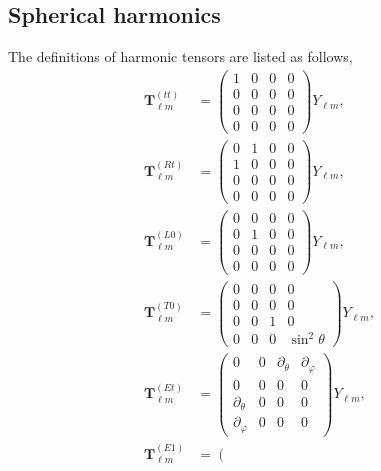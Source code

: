 \documentclass[reprint,amsmath,amssymb,aps,prd]{revtex4-2}
\begin{document}
\begin{widetext}
\appendix

\section{\label{app:spherical_harmonics}Spherical harmonics}
The definitions of harmonic tensors are listed as follows,
\begin{subequations}
\begin{align}
\mathbf{T}^{(tt)}_{\ell m}
&=\left(\begin{array}{cccc}
1 & 0 & 0 & 0\\
0 & 0 & 0 & 0\\
0 & 0 & 0 & 0 \\
0 & 0 & 0 & 0 
\end{array}\right)Y_{\ell m},\\
\mathbf{T}^{(Rt)}_{\ell m}
&=\left(\begin{array}{cccc}
0 & 1 & 0 & 0\\
1 & 0 & 0 & 0\\
0 & 0 & 0 & 0 \\
0 & 0 & 0 & 0 
\end{array}\right)Y_{\ell m},\\
\mathbf{T}^{(L0)}_{\ell m}
&=\left(\begin{array}{cccc}
0 & 0 & 0 & 0\\
0 & 1 & 0 & 0\\
0 & 0 & 0 & 0 \\
0 & 0 & 0 & 0 
\end{array}\right)Y_{\ell m},\\
\mathbf{T}^{(T0)}_{\ell m}
&=\left(\begin{array}{cccc}
0 & 0 & 0 & 0\\
0 & 0 & 0 & 0\\
0 & 0 & 1 & 0 \\
0 & 0 & 0 & \sin^2\theta 
\end{array}\right)Y_{\ell m},\\
\mathbf{T}^{(Et)}_{\ell m}
&=\left(\begin{array}{cccc}
0 & 0 & \partial_{\theta} & \partial_{\varphi}\\
0 & 0 & 0 & 0\\
\partial_{\theta} & 0 & 0 & 0 \\
\partial_{\varphi} & 0 & 0 & 0 
\end{array}\right)Y_{\ell m},\\
\mathbf{T}^{(E1)}_{\ell m}
&=\left(\begin{array}{cccc}

\end{array}
\end{align}
\end{subequations}
\end{widetext}
\end{document}
